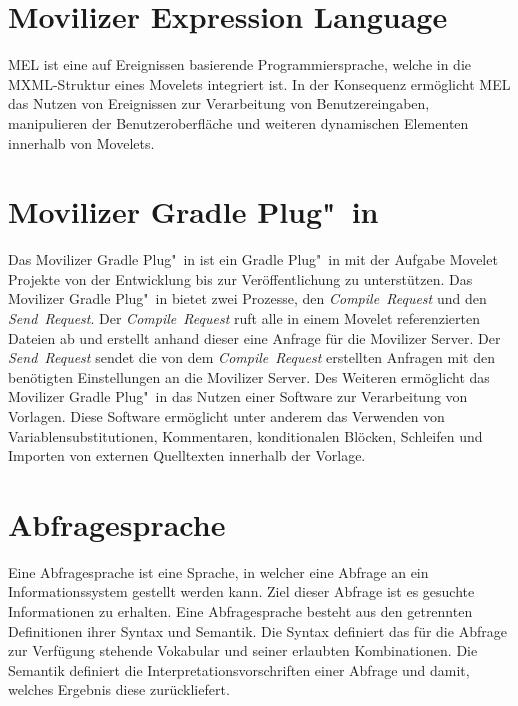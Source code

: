 \section{Movilizer Expression Language}
\ac{MEL} ist eine auf Ereignissen basierende Programmiersprache, welche in die \ac{MXML}-Struktur eines Movelets integriert ist. In der Konsequenz ermöglicht \ac{MEL} das Nutzen von Ereignissen zur Verarbeitung von Benutzereingaben, manipulieren der Benutzeroberfläche und weiteren dynamischen Elementen innerhalb von Movelets. 
\autocite[Vgl.][]{Nitschkowski.2018e}
\section{Movilizer Gradle Plug"~in} 
Das Movilizer Gradle Plug"~in ist ein Gradle Plug"~in mit der Aufgabe Movelet Projekte von der Entwicklung bis zur Veröffentlichung zu unterstützen. Das Movilizer Gradle Plug"~in bietet zwei Prozesse, den \mbox{\textit{Compile Request}} und den \mbox{\textit{Send Request}}. Der \mbox{\textit{Compile Request}} ruft alle in einem Movelet referenzierten Dateien ab und erstellt anhand dieser eine Anfrage für die Movilizer Server. Der \mbox{\textit{Send Request}} sendet die von dem \mbox{\textit{Compile Request}} erstellten Anfragen mit den benötigten Einstellungen an die Movilizer Server. Des Weiteren ermöglicht das Movilizer Gradle Plug"~in das Nutzen einer Software zur Verarbeitung von Vorlagen. Diese Software ermöglicht unter anderem das Verwenden von Variablensubstitutionen, Kommentaren, konditionalen Blöcken, Schleifen und Importen von externen Quelltexten innerhalb der Vorlage.
\autocite[Vgl.][]{Mula.2018}
\section{Abfragesprache} 
Eine Abfragesprache ist eine Sprache, in welcher eine Abfrage an ein Informationssystem gestellt werden kann. Ziel dieser Abfrage ist es gesuchte Informationen zu erhalten.
\autocite[Vgl.][S7f]{Reiner.1991}
Eine Abfragesprache besteht aus den getrennten Definitionen ihrer Syntax und Semantik. Die Syntax definiert das für die Abfrage zur Verfügung stehende Vokabular und seiner erlaubten Kombinationen. Die Semantik definiert die Interpretationsvorschriften einer Abfrage und damit, welches Ergebnis diese zurückliefert.
\autocite[Vgl.][S. 24]{Willenborg.2001}